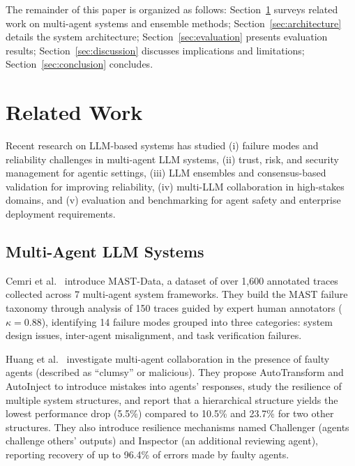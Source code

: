 \documentclass[sigconf]{acmart}
\begin{document}
The remainder of this paper is organized as follows: Section~\ref{sec:related} surveys related work on multi-agent systems and ensemble methods; Section~\ref{sec:architecture} details the system architecture; Section~\ref{sec:evaluation} presents evaluation results; Section~\ref{sec:discussion} discusses implications and limitations; Section~\ref{sec:conclusion} concludes.

\section{Related Work}
\label{sec:related}

Recent research on LLM-based systems has studied (i) failure modes and reliability challenges in multi-agent LLM systems, (ii) trust, risk, and security management for agentic settings, (iii) LLM ensembles and consensus-based validation for improving reliability, (iv) multi-LLM collaboration in high-stakes domains, and (v) evaluation and benchmarking for agent safety and enterprise deployment requirements.

\subsection{Multi-Agent LLM Systems}

Cemri et al.~\cite{Cemri2025} introduce MAST-Data, a dataset of over 1,600 annotated traces collected across 7 multi-agent system frameworks. They build the MAST failure taxonomy through analysis of 150 traces guided by expert human annotators ($\kappa = 0.88$), identifying 14 failure modes grouped into three categories: system design issues, inter-agent misalignment, and task verification failures.

Huang et al.~\cite{Huang2024Resilience} investigate multi-agent collaboration in the presence of faulty agents (described as ``clumsy'' or malicious). They propose AutoTransform and AutoInject to introduce mistakes into agents' responses, study the resilience of multiple system structures, and report that a hierarchical structure yields the lowest performance drop (5.5\%) compared to 10.5\% and 23.7\% for two other structures. They also introduce resilience mechanisms named Challenger (agents challenge others' outputs) and Inspector (an additional reviewing agent), reporting recovery of up to 96.4\% of errors made by faulty agents.
\end{document}
